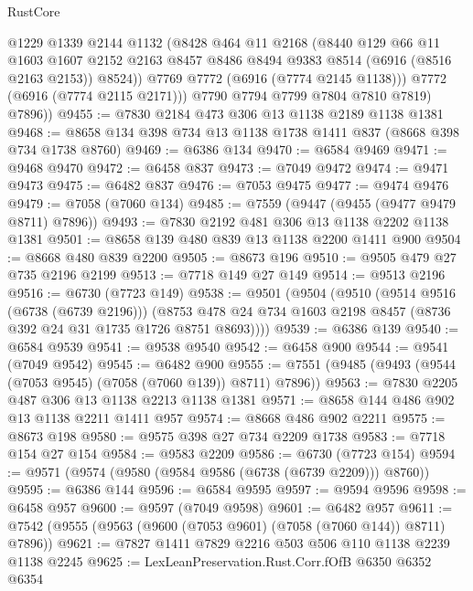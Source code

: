 \begin{lexlean}{RustCore}
\begin{coremodule}
              @1229
              @1339
              @2144
              @1132
              (@8428
                @464
                @11
                @2168
                (@8440
                  @129
                  @66
                  @11
                  @1603
                  @1607
                  @2152
                  @2163
                  @8457
                  @8486
                  @8494
                  @9383
                  @8514
                  (@6916 (@8516 @2163 @2153))
                  @8524))
              @7769
              @7772
              (@6916 (@7774 @2145 @1138)))
            @7772
            (@6916 (@7774 @2115 @2171)))
          @7790
          @7794
          @7799
          @7804
          @7810
          @7819)
        @7896))
@9455 := @7830 @2184 @473 @306 @13 @1138 @2189 @1138 @1381
@9468 := @8658 @134 @398 @734 @13 @1138 @1738 @1411 @837 (@8668 @398 @734 @1738 @8760)
@9469 := @6386 @134
@9470 := @6584 @9469
@9471 := @9468 @9470
@9472 := @6458 @837
@9473 := @7049 @9472
@9474 := @9471 @9473
@9475 := @6482 @837
@9476 := @7053 @9475
@9477 := @9474 @9476
@9479 := @7058 (@7060 @134)
@9485 := @7559 (@9447 (@9455 (@9477 @9479 @8711) @7896))
@9493 := @7830 @2192 @481 @306 @13 @1138 @2202 @1138 @1381
@9501 := @8658 @139 @480 @839 @13 @1138 @2200 @1411 @900
@9504 := @8668 @480 @839 @2200
@9505 := @8673 @196
@9510 := @9505 @479 @27 @735 @2196 @2199
@9513 := @7718 @149 @27 @149
@9514 := @9513 @2196
@9516 := @6730 (@7723 @149)
@9538 := @9501
    (@9504
      (@9510
        (@9514 @9516 (@6738 (@6739 @2196)))
        (@8753 @478 @24 @734 @1603 @2198 @8457 (@8736 @392 @24 @31 @1735 @1726 @8751 @8693))))
@9539 := @6386 @139
@9540 := @6584 @9539
@9541 := @9538 @9540
@9542 := @6458 @900
@9544 := @9541 (@7049 @9542)
@9545 := @6482 @900
@9555 := @7551 (@9485 (@9493 (@9544 (@7053 @9545) (@7058 (@7060 @139)) @8711) @7896))
@9563 := @7830 @2205 @487 @306 @13 @1138 @2213 @1138 @1381
@9571 := @8658 @144 @486 @902 @13 @1138 @2211 @1411 @957
@9574 := @8668 @486 @902 @2211
@9575 := @8673 @198
@9580 := @9575 @398 @27 @734 @2209 @1738
@9583 := @7718 @154 @27 @154
@9584 := @9583 @2209
@9586 := @6730 (@7723 @154)
@9594 := @9571 (@9574 (@9580 (@9584 @9586 (@6738 (@6739 @2209))) @8760))
@9595 := @6386 @144
@9596 := @6584 @9595
@9597 := @9594 @9596
@9598 := @6458 @957
@9600 := @9597 (@7049 @9598)
@9601 := @6482 @957
@9611 := @7542 (@9555 (@9563 (@9600 (@7053 @9601) (@7058 (@7060 @144)) @8711) @7896))
@9621 := @7827 @1411 @7829 @2216 @503 @506 @110 @1138 @2239 @1138 @2245
@9625 := LexLeanPreservation.Rust.Corr.fOfB @6350 @6352 @6354

\end{coremodule}
\end{lexlean}
